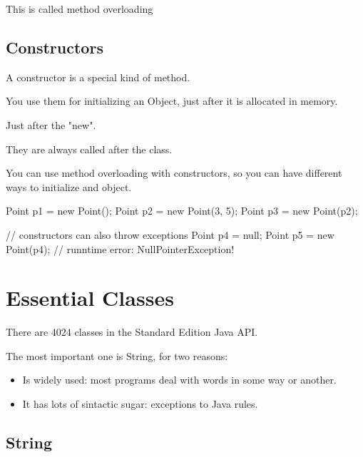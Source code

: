 \documentclass[a4paper, 9pt]{extarticle}
\begin{document}
This is called method overloading

\subsection{Constructors}

A constructor is a special kind of method.

You use them for initializing an Object, just after it is allocated in memory.

Just after the "new".

They are always called after the class.

You can use method overloading with constructors, so you can have different
ways to initialize and object.

\begin{blackboard}
Point p1 = new Point();
Point p2 = new Point(3, 5);
Point p3 = new Point(p2);

// constructors can also throw exceptions
Point p4 = null;
Point p5 = new Point(p4); // runntime error: NullPointerException!
\end{blackboard}

\section{Essential Classes}

There are 4024 classes in the Standard Edition Java API.

The most important one is String, for two reasons:

\begin{itemize}

  \item Is widely used: most programs deal with words in some way or another.

  \item It has lots of sintactic sugar: exceptions to Java rules.

\end{itemize}

\subsection{String}
\end{document}
